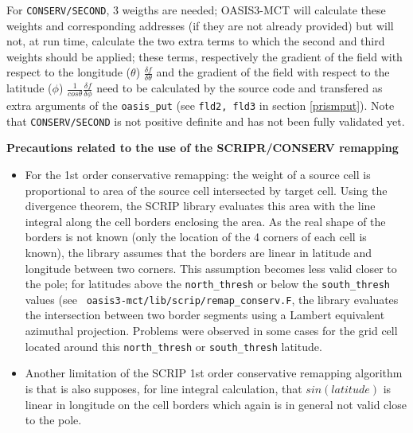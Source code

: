 \begin{itemize}
\begin{itemize}
\begin{itemize}
      For {\tt CONSERV/SECOND}, 3 weigths are needed; OASIS3-MCT will
      calculate these weights and corresponding addresses (if they are
      not already provided) but will not, at run time, calculate the
      two extra terms to which the second and third weights should be
      applied; these terms, respectively the gradient of the field
      with respect to the longitude ($\theta$) $\frac{\delta f}{\delta
        \theta}$ and the gradient of the field with respect to the
      latitude ($\phi$) $\frac{1}{cos \theta}\frac{\delta f}{\delta
        \phi}$ need to be calculated by the source code and transfered
      as extra arguments of the {\tt oasis\_put} (see {\tt fld2, fld3}
      in section \ref{prismput}).  Note that {\tt CONSERV/SECOND} is
      not positive definite and has not been fully validated yet.

    \end{itemize}

  \end{itemize}

  {\bf Precautions related to the use of the SCRIPR/CONSERV remapping}

  \begin{itemize}

  \item For the 1st order conservative remapping: the weight of a
    source cell is proportional to area of the source cell intersected
    by target cell.  Using the divergence theorem, the SCRIP library
    evaluates this area with the line integral along the cell borders
    enclosing the area. As the real shape of the borders is not known
    (only the location of the 4 corners of each cell is known), the
    library assumes that the borders are linear in latitude and
    longitude between two corners.  This assumption becomes less valid
    closer to the pole; for latitudes above the {\tt north\_thresh}
    or below the {\tt south\_thresh} values (see {\tt
      oasis3-mct/lib/scrip/remap\_conserv.F}, the library evaluates
    the intersection between two border segments using a Lambert
    equivalent azimuthal projection. Problems were observed in some
    cases for the grid cell located around this {\tt north\_thresh} or
    {\tt south\_thresh} latitude.

  \item Another limitation of the SCRIP 1st order conservative
    remapping algorithm is that is also supposes, for line integral
    calculation, that $sin(latitude)$ is linear in longitude on the
    cell borders which again is in general not valid close to the
    pole.


\end{itemize}
\end{itemize}
